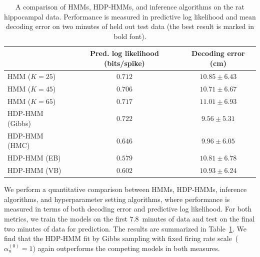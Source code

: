 \begin{table}[b]
  \centering
  \caption[Comparison of models on real hippocampal data]{A comparison
    of HMMs, HDP-HMMs, and inference algorithms on the rat hippocampal
    data. Performance is measured in predictive log likelihood and
    mean decoding error on two minutes of held out test data (the best
    result is marked in bold font).}
  \begin{tabular}{l|cc}
    & Pred. log likelihood (bits/spike) & Decoding error (cm) \\
    \hline 
    HMM ($K=25$)         & $0.712$ & $10.85 \pm 6.43$ \\
    HMM ($K=45$)         & $0.706$ & $10.71 \pm 6.67$\\
    HMM ($K=65$)         & $0.717$ & $11.01 \pm 6.93$\\
    HDP-HMM (Gibbs)      & $\mathbf{0.722}$ & $\mathbf{9.56 \pm 5.31}$ \\
    HDP-HMM (HMC)        & $0.646$ & $9.96 \pm 6.05$\\
    HDP-HMM (EB)         & $0.579$ & $10.81 \pm 6.78$\\
    HDP-HMM (VB)         & $0.602$ & $10.93 \pm 6.24$
  \end{tabular}
  \label{tab:hipp_err}
\end{table}

We perform a quantitative comparison between HMMs, HDP-HMMs, inference
algorithms, and hyperparameter setting algorithms, where performance
is measured in terms of both decoding error and predictive log
likelihood. For both metrics, we train the models on the first
$7.8$~minutes of data and test on the final two minutes of data for
prediction. The results are summarized in Table~\ref{tab:hipp_err}. We
find that the HDP-HMM fit by Gibbs sampling with fixed firing rate
scale~($\alpha_n^{(0)}=1$) again outperforms the competing models in both
measures.

